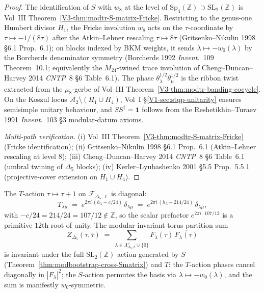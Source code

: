 \begin{proof}
The identification of $S$ with $w_8$ at the level of
$\mathrm{Sp}_4(\mathbb Z)\supset\mathrm{SL}_2(\mathbb Z)$
is Vol~III Theorem~\ref{V3-thm:modtr-S-matrix-Fricke}.
Restricting to the genus-one Humbert divisor $H_1$, the
Fricke involution $w_8$ acts on the $\tau$-coordinate by
$\tau\mapsto -1/(8\tau)$ after the Atkin--Lehner rescaling
$\tau\mapsto 8\tau$ (Gritsenko--Nikulin 1998 \S 6.1 Prop.~6.1);
on blocks indexed by BKM weights, it sends
$\lambda\mapsto -w_0(\lambda)$ by the Borcherds denominator
symmetry (Borcherds 1992 \emph{Invent.}~109 Theorem~10.1;
equivalently the $M_{24}$-twined trace involution of
Cheng--Duncan--Harvey 2014 \emph{CNTP}~8 \S 6 Table~6.1).
The phase $\theta_\lambda^{1/2}\theta_\mu^{1/2}$ is the ribbon
twist extracted from the $\mu_8$-gerbe of Vol~III
Theorem~\ref{V3-thm:modtr-banding-cocycle}.
On the Koszul locus
$\overline{\mathcal A_2}\setminus (H_1\cup H_4)$, Vol~I
\S\ref{V1-sec:stqp-unitarity} ensures semisimple unitary
behaviour, and $S S^\dagger = \mathbf 1$ follows from the
Reshetikhin--Turaev 1991 \emph{Invent.}~103 \S 3
modular-datum axioms.

\emph{Multi-path verification.}
(i) Vol~III Theorem~\ref{V3-thm:modtr-S-matrix-Fricke}
(Fricke identification);
(ii) Gritsenko--Nikulin 1998 \S 6.1 Prop.~6.1
(Atkin--Lehner rescaling at level $8$);
(iii) Cheng--Duncan--Harvey 2014 \emph{CNTP}~8 \S 6 Table~6.1
(umbral twining of $\Delta_5$ blocks);
(iv) Kerler--Lyubashenko 2001 \S 5.5 Prop.~5.5.1
(projective-cover extension on $H_1\cup H_4$).
\end{proof}

\begin{proposition}
\label{prop:modbootstrap-cross-Tmatrix}
The $T$-action $\tau\mapsto\tau + 1$ on $\mathcal F_{\Delta_5, \ell}$
is diagonal:
\[
 T_{\lambda\mu} \;=\; e^{2\pi i\,(h_\lambda - c/24)}\,\delta_{\lambda\mu}
 \;=\; e^{2\pi i\,(h_\lambda + 214/24)}\,\delta_{\lambda\mu},
\]
with $-c/24 = 214/24 = 107/12\notin\mathbb Z$, so the scalar
prefactor $e^{2\pi i\cdot 107/12}$ is a primitive $12$th root of
unity. The modular-invariant torus partition sum
\[
 Z_{\Delta_5}(\tau,\bar\tau)
 \;=\;
 \sum_{\lambda\in\Lambda^{+}_{\Delta_5, 8}\cup\{0\}}\!\!
 F_\lambda(\tau)\,\overline{F_\lambda(\tau)}
\]
is invariant under the full $\mathrm{SL}_2(\mathbb Z)$ action
generated by $S$ (Theorem~\ref{thm:modbootstrap-cross-Smatrix}) and
$T$: the $T$-action phases cancel diagonally in
$|F_\lambda|^2$; the $S$-action permutes the basis via
$\lambda\mapsto -w_0(\lambda)$, and the sum is manifestly
$w_0$-symmetric.
\end{proposition}

